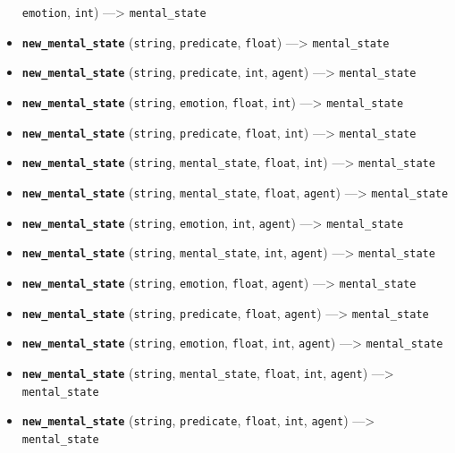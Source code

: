 \documentclass[]{book}
\theoremstyle{definition}
\theoremstyle{definition}
\theoremstyle{definition}
\theoremstyle{remark}
\begin{document}
\begin{itemize}
  \texttt{emotion}, \texttt{int}) ---\textgreater{}
  \texttt{mental\_state}
\item
  \textbf{\texttt{new\_mental\_state}} (\texttt{string},
  \texttt{predicate}, \texttt{float}) ---\textgreater{}
  \texttt{mental\_state}
\item
  \textbf{\texttt{new\_mental\_state}} (\texttt{string},
  \texttt{predicate}, \texttt{int}, \texttt{agent}) ---\textgreater{}
  \texttt{mental\_state}
\item
  \textbf{\texttt{new\_mental\_state}} (\texttt{string},
  \texttt{emotion}, \texttt{float}, \texttt{int}) ---\textgreater{}
  \texttt{mental\_state}
\item
  \textbf{\texttt{new\_mental\_state}} (\texttt{string},
  \texttt{predicate}, \texttt{float}, \texttt{int}) ---\textgreater{}
  \texttt{mental\_state}
\item
  \textbf{\texttt{new\_mental\_state}} (\texttt{string},
  \texttt{mental\_state}, \texttt{float}, \texttt{int})
  ---\textgreater{} \texttt{mental\_state}
\item
  \textbf{\texttt{new\_mental\_state}} (\texttt{string},
  \texttt{mental\_state}, \texttt{float}, \texttt{agent})
  ---\textgreater{} \texttt{mental\_state}
\item
  \textbf{\texttt{new\_mental\_state}} (\texttt{string},
  \texttt{emotion}, \texttt{int}, \texttt{agent}) ---\textgreater{}
  \texttt{mental\_state}
\item
  \textbf{\texttt{new\_mental\_state}} (\texttt{string},
  \texttt{mental\_state}, \texttt{int}, \texttt{agent})
  ---\textgreater{} \texttt{mental\_state}
\item
  \textbf{\texttt{new\_mental\_state}} (\texttt{string},
  \texttt{emotion}, \texttt{float}, \texttt{agent}) ---\textgreater{}
  \texttt{mental\_state}
\item
  \textbf{\texttt{new\_mental\_state}} (\texttt{string},
  \texttt{predicate}, \texttt{float}, \texttt{agent}) ---\textgreater{}
  \texttt{mental\_state}
\item
  \textbf{\texttt{new\_mental\_state}} (\texttt{string},
  \texttt{emotion}, \texttt{float}, \texttt{int}, \texttt{agent})
  ---\textgreater{} \texttt{mental\_state}
\item
  \textbf{\texttt{new\_mental\_state}} (\texttt{string},
  \texttt{mental\_state}, \texttt{float}, \texttt{int}, \texttt{agent})
  ---\textgreater{} \texttt{mental\_state}
\item
  \textbf{\texttt{new\_mental\_state}} (\texttt{string},
  \texttt{predicate}, \texttt{float}, \texttt{int}, \texttt{agent})
  ---\textgreater{} \texttt{mental\_state}
\end{itemize}
\end{document}
